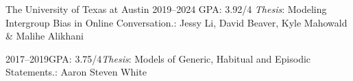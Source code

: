 {The University of Texas at Austin}
{2019--2024}
{\rmsc GPA: 3.92/4}
{{\itshape Thesis}: Modeling Intergroup Bias in Online Conversation.: Jessy Li, David Beaver, Kyle Mahowald \& Malihe Alikhani}

    {2017--2019}{\rmsc GPA: 3.75/4}{{\itshape Thesis}: Models of Generic, Habitual and Episodic Statements.: Aaron Steven White}

